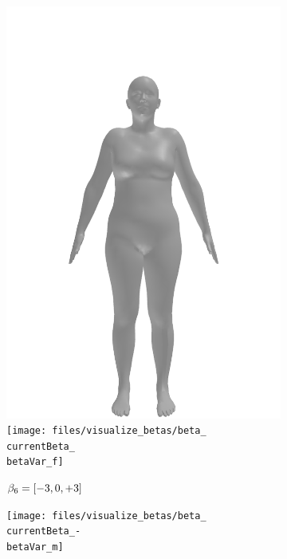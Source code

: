 \begin{figure}[h!]
\begin{subfigure}{\betaWidth}
        \includegraphics[width=\imgWidth]{files/visualize_betas/baseline_f}
        \texttt{[image: files/visualize\_betas/beta\_\\currentBeta\_\\betaVar\_f]}
        \caption{$\beta_6 = [-3, 0, +3]$}
    \end{subfigure}
    \begin{subfigure}{\betaWidth}
        \def\currentBeta{6}
        \centering
        \texttt{[image: files/visualize\_betas/beta\_\\currentBeta\_-\\betaVar\_m]}

\end{subfigure}
\end{figure}
